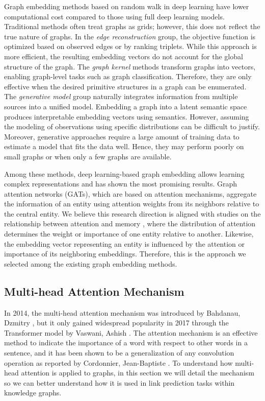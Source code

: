 Graph embedding methods based on random walk in deep learning have lower computational cost compared to those using full deep learning models. Traditional methods often treat graphs as grids; however, this does not reflect the true nature of graphs. In the \textit{edge reconstruction} group, the objective function is optimized based on observed edges or by ranking triplets. While this approach is more efficient, the resulting embedding vectors do not account for the global structure of the graph. The \textit{graph kernel} methods transform graphs into vectors, enabling graph-level tasks such as graph classification. Therefore, they are only effective when the desired primitive structures in a graph can be enumerated. The \textit{generative model} group naturally integrates information from multiple sources into a unified model. Embedding a graph into a latent semantic space produces interpretable embedding vectors using semantics. However, assuming the modeling of observations using specific distributions can be difficult to justify. Moreover, generative approaches require a large amount of training data to estimate a model that fits the data well. Hence, they may perform poorly on small graphs or when only a few graphs are available.

Among these methods, deep learning-based graph embedding allows learning complex representations and has shown the most promising results. Graph attention networks (GATs), which are based on attention mechanisms, aggregate the information of an entity using attention weights from its neighbors relative to the central entity. We believe this research direction is aligned with studies on the relationship between attention and memory \cite{memoryandattention:2020}, where the distribution of attention determines the weight or importance of one entity relative to another. Likewise, the embedding vector representing an entity is influenced by the attention or importance of its neighboring embeddings. Therefore, this is the approach we selected among the existing graph embedding methods.

\subsection{Multi-head Attention Mechanism}

In 2014, the multi-head attention mechanism was introduced by Bahdanau, Dzmitry \cite{bahdanau2014neural}, but it only gained widespread popularity in 2017 through the Transformer model by Vaswani, Ashish \cite{vaswani2017attention}. The attention mechanism is an effective method to indicate the importance of a word with respect to other words in a sentence, and it has been shown to be a generalization of any convolution operation as reported by Cordonnier, Jean-Baptiste \cite{cordonnier2019relationship}. To understand how multi-head attention is applied to graphs, in this section we will detail the mechanism so we can better understand how it is used in link prediction tasks within knowledge graphs.

